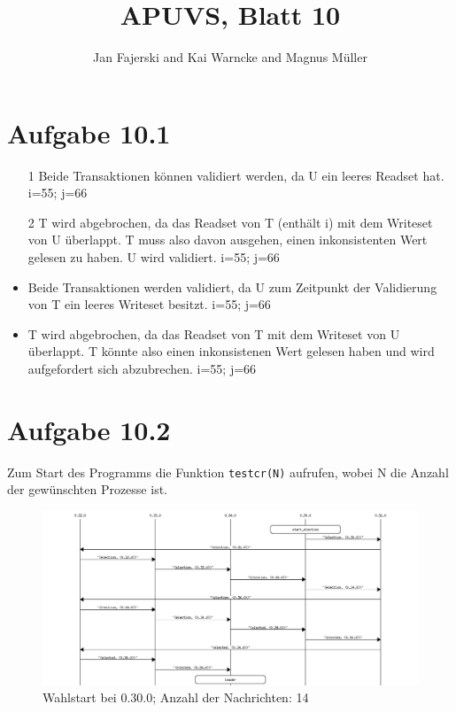 \documentclass[a4paper,
12pt,
BCOR12mm,
]{scrartcl}
\title{APUVS, Blatt 10}
\author{Jan Fajerski and Kai Warncke and Magnus Müller}
\theoremstyle{break}
\begin{document}

\maketitle 

\section*{Aufgabe 10.1}
\begin{itemize}
  \item[1] Beide Transaktionen können validiert werden, da U ein leeres Readset
    hat. i=55; j=66
  \item[2] T wird abgebrochen, da das Readset von T (enthält i) mit dem Writeset
    von U überlappt. T muss also davon ausgehen, einen inkonsistenten Wert
    gelesen zu haben. U wird validiert. i=55; j=66
  \item Beide Transaktionen werden validiert, da U zum Zeitpunkt der Validierung
    von T ein leeres Writeset besitzt. i=55; j=66
  \item T wird abgebrochen, da das Readset von T mit dem Writeset von U
    überlappt. T könnte also einen inkonsistenen Wert gelesen haben und wird
    aufgefordert sich abzubrechen. i=55; j=66
\end{itemize}

\section*{Aufgabe 10.2}
 Zum Start des Programms die Funktion \verb+testcr(N)+ aufrufen, wobei N die Anzahl der
 gewünschten Prozesse ist. 
 
 
 

 \pagebreak

 \begin{figure}
   \begin{center}
     \includegraphics[scale=0.4]{../src/msc/single_election_at_0.30.0.png}
   \end{center}
   \caption{Wahlstart bei 0.30.0; Anzahl der Nachrichten: 14}
   \label{fig:s_30}
 \end{figure}
\end{document}
